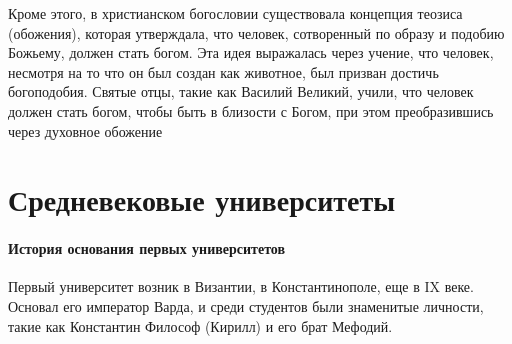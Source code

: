 Кроме этого, в христианском богословии существовала концепция теозиса (обожения), которая утверждала, что человек, сотворенный по образу и подобию Божьему, должен стать богом. Эта идея выражалась через учение, что человек, несмотря на то что он был создан как животное, был призван достичь богоподобия. Святые отцы, такие как Василий Великий, учили, что человек должен стать богом, чтобы быть в близости с Богом, при этом преобразившись через духовное обожение

\section{Средневековые университеты}


\paragraph{История основания первых университетов}
Первый университет возник в Византии, в Константинополе, еще в IX веке. Основал его император Варда, и среди студентов были знаменитые личности, такие как Константин Философ (Кирилл) и его брат Мефодий. 

